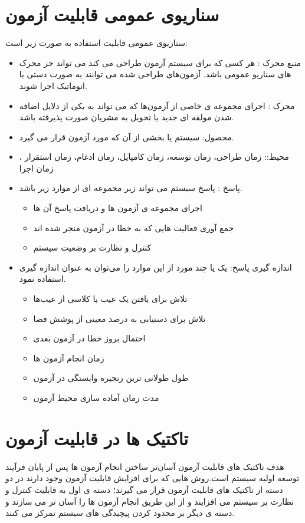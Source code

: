 \section{سناریوی عمومی قابلیت آزمون}
سناریو‌ی عمومی قابلیت استفاده به صورت زیر است:
\begin{itemize}
\item
منبع محرک : هر کسی که برای سیستم آزمون طراحی می کند می تواند جز محرک های سناریو عمومی باشد. آزمون‌های طراحی شده می توانند به صورت دستی یا اتوماتیک اجرا شوند.
\item
محرک : اجرای مجموعه ی خاصی از آزمون‌ها که می تواند به یکی از دلایل اضافه شدن مولفه ای جدید یا تحویل به مشریان صورت پذیرفته باشد.
\item
محصول: سیستم یا بخشی از آن که مورد آزمون قرار می گیرد.
\item
محیط:: زمان طراحی، زمان توسعه، زمان کامپایل، زمان ادغام، زمان استقرار ، زمان اجرا
\item
پاسخ : 
پاسخ سیستم می تواند زیر مجموعه ای از موارد زیر باشد.
\begin{itemize}
\item
اجرای مجموعه ی آزمون ها و دریافت پاسخ آن ها
\item
جمع آوری فعالیت هایی که به خطا در آزمون منجر شده اند
\item
کنترل و نظارت بر وضعیت سیستم
\end{itemize}

\item
اندازه گیری پاسخ: یک یا چند مورد از این موارد را می‌توان به عنوان اندازه گیری استفاده نمود.
\begin{itemize}
\item
تلاش برای یافتن یک عیب یا کلاسی از عیب‌ها
\item
تلاش برای دستیابی به درصد معینی از پوشش فضا
\item
احتمال بروز خطا در آزمون بعدی
\item
زمان انجام آزمون ها
\item
طول طولانی ترین زنجیره وابستگی در آزمون
\item
مدت زمان آماده سازی محیط آزمون
\end{itemize}
\end{itemize}

\section{تاکتیک ها در قابلیت آزمون}
هدف تاکتیک های قابلیت آزمون آسان‌تر ساختن انجام آزمون ها پس از پایان فرآیند توسعه اولیه سیستم است.روش هایی که برای افزایش قابلیت آزمون وجود دارند در دو دسته از تاکتیک های قابلیت آزمون قرار می گیرند؛ ‌دسته ی اول به قابلیت کنترل و نظارت بر سیستم می افزایند و از این طریق انجام آزمون ها را آسان تر می سازند و دسته ی دیگر بر محدود کردن پیچیدگی های سیستم تمرکز می کنند.
